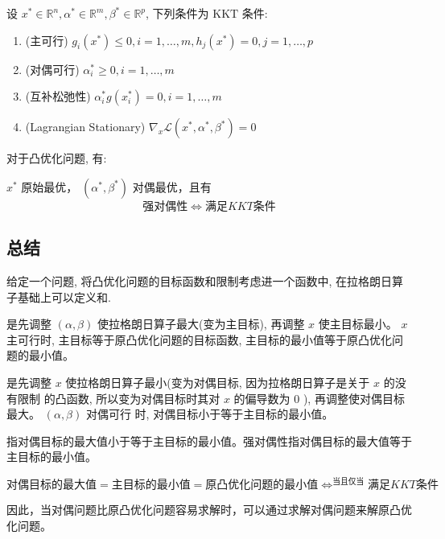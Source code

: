\begin{theorem}
    设 $ x^{*} \in \mathbb{R}^{n}, \alpha^{*} \in \mathbb{R}^{m}, \beta^{*} \in \mathbb{R}^{p} $, 下列条件为 $ \mathrm{KKT} $ 条件:

    \begin{enumerate}
        \item (主可行) $ g_{i}\left(x^{*}\right) \leqslant 0, i=1, \ldots, m, h_{j}\left(x^{*}\right)=0, j=1, \ldots, p $
        \item (对偶可行) $ \alpha_{i}^{*} \geqslant 0, i=1, \ldots, m $
        \item (互补松弛性) $ \alpha_{i}^{*} g\left(x_{i}^{*}\right)=0, i=1, \ldots, m $
        \item (Lagrangian Stationary) $ \nabla_{x} \mathcal{L}\left(x^{*}, \alpha^{*}, \beta^{*}\right)=0 $
    \end{enumerate}

\end{theorem}

\begin{theorem}
    对于凸优化问题, 有:

$ x^{*} $ 原始最优， $ \left(\alpha^{*}, \beta^{*}\right) $ 对偶最优，且有$$ 强对偶性 \Leftrightarrow  满足  K K T  条件$$
\end{theorem}

\subsection{总结}


给定一个问题, 将凸优化问题的目标函数和限制考虑进一个函数中, 在拉格朗日算子基础上可以定义和.

是先调整 $ (\alpha, \beta) $ 使拉格朗日算子最大(变为主目标), 再调整 $ x $ 使主目标最小。 $ x $ 主可行时, 主目标等于原凸优化问题的目标函数, 主目标的最小值等于原凸优化问题的最小值。

是先调整 $ x $ 使拉格朗日算子最小(变为对偶目标, 因为拉格朗日算子是关于 $ x $ 的没有限制 的凸函数, 所以变为对偶目标时其对 $ x $ 的偏导数为 0 ), 再调整使对偶目标最大。 $ (\alpha, \beta) $ 对偶可行 时, 对偶目标小于等于主目标的最小值。

指对偶目标的最大值小于等于主目标的最小值。强对偶性指对偶目标的最大值等于主目标的最小值。

$$对偶目标的最大值=主目标的最小值=原凸优化问题的最小值 \Leftrightarrow^{当且仅当}满足KKT条件$$

因此，当对偶问题比原凸优化问题容易求解时，可以通过求解对偶问题来解原凸优化问题。


